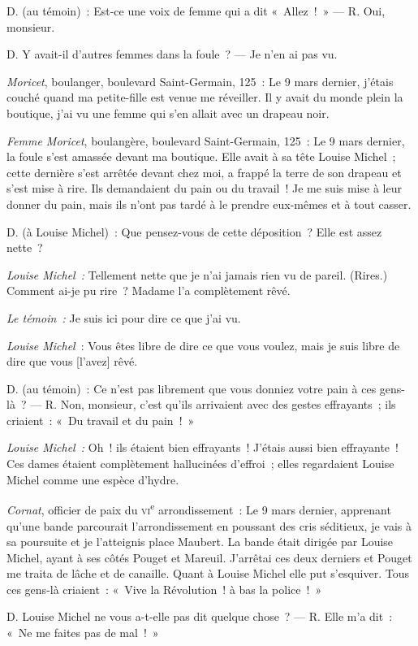 \documentclass[french,twoside]{book} %
\newcommand\corr[1]{#1}
\begin{document}
D. (au témoin) : Est-ce une voix de femme qui a dit « Allez ! » — R. Oui, monsieur.\par
D. Y avait-il d’autres femmes dans la foule ? — Je n’en ai pas vu.\par
\emph{Moricet}, boulanger, boulevard Saint-Germain, 125 : Le 9 mars dernier, j’étais couché quand ma petite-fille est venue me réveiller. Il y avait du monde plein la boutique, j’ai vu une femme qui s’en allait avec un drapeau noir.\par
\emph{Femme Moricet}, boulangère, boulevard Saint-Germain, 125 : Le 9 mars dernier, la foule s’est amassée devant ma boutique. Elle avait à sa tête Louise Michel ; cette dernière s’est arrêtée devant chez moi, a frappé la terre de son drapeau et s’est mise à rire. Ils demandaient du pain ou du travail ! Je me suis mise à leur donner du pain, mais ils n’ont pas tardé à le prendre eux-mêmes et à tout casser.\par
D. (à Louise Michel) : Que pensez-vous de cette déposition ? Elle est assez nette ?\par
 \emph{Louise Michel :} Tellement nette que je n’ai jamais rien vu de pareil. (Rires.) Comment ai-je pu rire ? Madame l’a complètement rêvé.\par
\emph{Le témoin :} Je suis ici pour dire ce que j’ai vu.\par
\emph{Louise Michel} : Vous êtes libre de dire ce que vous voulez, mais je suis libre de dire que vous [{\corr l’avez}] rêvé.\par
D. (au témoin) : Ce n’est pas librement que vous donniez votre pain à ces gens-là ? — R. Non, monsieur, c’est qu’ils arrivaient avec des gestes effrayants ; ils criaient : « Du travail et du pain ! »\par
\emph{Louise Michel :} Oh ! ils étaient bien effrayants ! J’étais aussi bien effrayante ! Ces dames étaient complètement hallucinées d’effroi ; elles regardaient Louise Michel comme une espèce d’hydre.\par
\emph{Cornat}, officier de paix du {\scshape vi}\textsuperscript{e} arrondissement : Le 9 mars dernier, apprenant qu’une bande parcourait l’arrondissement en poussant des cris séditieux, je vais à sa poursuite et je l’atteignis place Maubert. La bande était dirigée par Louise Michel, ayant à ses côtés Pouget et Mareuil. J’arrêtai ces deux derniers et Pouget me traita de lâche et de canaille. Quant à Louise Michel elle put s’esquiver. Tous ces gens-là criaient : « Vive la Révolution ! à bas la police ! »\par
D. Louise Michel ne vous a-t-elle pas dit quelque chose ? — R. Elle m’a dit : « Ne me faites pas de mal ! »\par
\end{document}

